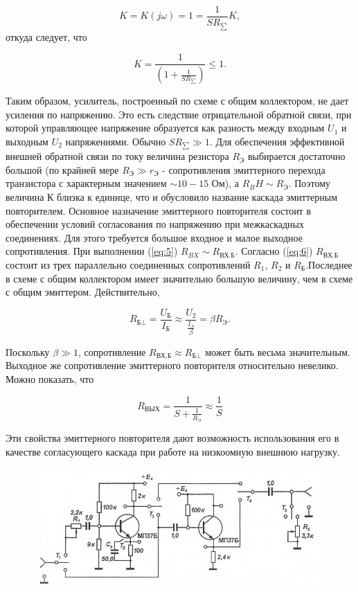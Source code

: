 $$K=K(j\omega)=1=\frac{1}{SR_{\sum}}K,$$
откуда следует, что

$$K=\frac{1}{(1+\frac{1}{SR_{\sum}})}\leq 1.$$

Таким образом, усилитель, построенный по схеме с общим коллектором, не дает усиления по напряжению. Это есть следствие отрицательной обратной связи, при которой управляющее
напряжение образуется как разность между входным $U_1$ и выходным $U_2$ напряжениями. Обычно $SR_{\sum}\gg1$. Для обеспечения эффективной внешней обратной связи по току величина резистора $R_{\text{Э}}$ выбирается достаточно большой (по крайней мере $R_{\text{Э}} \gg r_{\text{Э}}$ - сопротивления эмиттерного перехода транзистора с характерным значением $\sim 10-15$ Ом), а $R_BH \sim R_{\text{Э}}$. Поэтому величина К близка к единице, что и обусловило название каскада эмиттерным повторителем. Основное назначение эмиттерного повторителя состоит в обеспечении условий согласования по напряжению при межкаскадных соединениях. Для этого требуется большое входное и малое выходное сопротивления. При выполнении (\ref{eq:5}) $R_{BX} \sim R_{\text{ВХ.Б}}$. Согласно (\ref{eq:6})  $R_{\text{ВХ.Б}}$ состоит из трех параллельно соединенных сопротивлений $R_1$, $R_2$ и $R_{\text{Б}}$.Последнее в схеме с общим коллектором имеет значительно большую величину, чем в схеме с общим эмиттером. Действительно,

$$R_{\text{Б} \bot}=\frac{U_{\text{Б}}}{I_{\text{Б}}} \approx \frac{U_2}{ \frac{ I_{ \text{Э} } }{\beta}}=\beta R_{\text{Э}}.$$

Поскольку $\beta \gg 1$, сопротивление  $R_{\text{ВХ.Б}} \approx R_{\text{Б} \bot}$ может быть весьма значительным. Выходное же сопротивление эмиттерного повторителя относительно невелико. Можно показать, что

$$R_{\text{ВЫХ}}=\frac{1}{S+\frac{1}{R_{\text{Э}}}} \approx \frac{1}{S}$$

Эти свойства эмиттерного повторителя дают возможность использования его в качестве согласующего каскада при работе на низкоомную внешнюю нагрузку.

\begin{figure}[h!]
	\centering
	\includegraphics[width=\linewidth]{fig/fig7}
	\caption{}
	\label{fig:7}
\end{figure}

